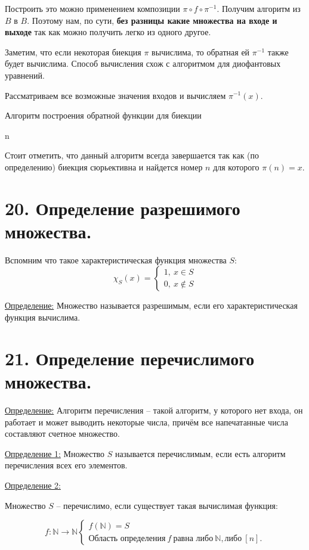 \documentclass[a4paper, 12pt]{article}
\newcommand{\definition}{\underline{Определение:} }
\newcommand{\definitionone}{\underline{Определение 1:} }
\newcommand{\definitiontwo}{\underline{Определение 2:} }
\newcommand{\N}{\mathbb{N}}
\begin{document}
Построить это можно применением композиции  $\pi \circ f \circ \pi^{-1}$. Получим алгоритм из $B$ в $B$. 
Поэтому нам, по сути, \textbf{без разницы какие множества на входе
и выходе} так как можно получить легко из одного другое.

Заметим, что если некоторая биекция $\pi$ вычислима, то обратная ей $\pi^{-1}$ также будет вычислима. Способ вычисления схож с алгоритмом для диофантовых уравнений.

Рассматриваем все возможные значения входов и вычисляем $\pi^{-1}(x)$.
\begin{algorithm}
\caption{Алгоритм построения обратной функции для биекции}
\begin{algorithmic}[1]
            \State \Return n
        \EndIf
    \EndFor
\EndFunction
\end{algorithmic}
\end{algorithm}

Стоит отметить, что данный алгоритм всегда завершается так как
(по определению) биекция сюрьективна и найдется номер $n$ для
которого $\pi(n) = x$.

\section*{20. Определение разрешимого множества.}

Вспомним что такое характеристическая функция множества $S$:
\[
\chi_S(x) = \begin{cases}
    1,\ x \in S \\
    0,\ x \notin S
\end{cases}
\]

\definition{Множество называется разрешимым, если его
характеристическая функция вычислима.}

\section*{21. Определение перечислимого множества.}

\definition{Алгоритм перечисления -- такой алгоритм, у которого нет входа, он работает и может выводить некоторые числа, причём все напечатанные числа составляют счетное множество.}

\definitionone{Множество $S$ называется перечислимым, если есть алгоритм перечисления всех его элементов.}

\definitiontwo{Множество $S$ -- перечислимо, если существует такая вычислимая функция:

\[
    f: \N \to \N
    \begin{cases}
        f(\N) = S \\
        \text{Область определения} \ f \ \text{равна либо} \ \N, \text{либо} \ [n].
    \end{cases}
\]

}
\end{document}
